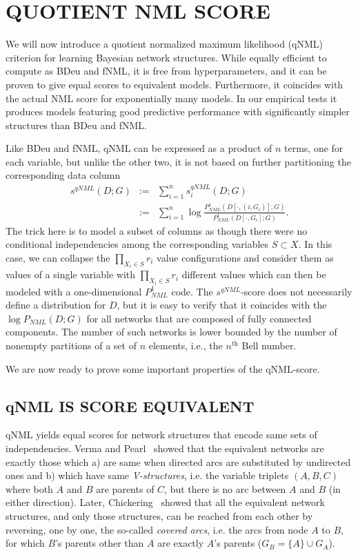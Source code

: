 \section{QUOTIENT NML SCORE}

We will now introduce a quotient normalized maximum likelihood (qNML)
criterion for learning Bayesian network structures.  While equally
efficient to compute as BDeu and fNML, it is free from
hyperparameters, and it can be proven to give equal scores to
equivalent models. Furthermore, it coincides with the actual NML score
for exponentially many models. In our empirical tests it produces
models featuring good predictive performance with significantly
simpler structures than BDeu and fNML.

Like BDeu and fNML, qNML can be expressed as a product of $n$ terms,
one for each variable, but unlike the other two, it is not based on
further partitioning the corresponding data column
\begin{eqnarray}
\label{eqn:qnmldef}
s^{qNML}(D;G) & := & \sum_{i=1}^n s^{qNML}_i(D;G)\\
& := & \sum_{i=1}^n \log \frac{P^1_{NML}(D[\cdot,(i,G_i)];G)}
                             {P^1_{NML}(D[\cdot,G_i];G)}.\nonumber
\end{eqnarray}
The trick here is to model a subset of columns as though there were no
conditional independencies among the corresponding variables $S
\subset X$.  In this case, we can collapse the $\prod_{X_i\in S} r_i$
value configurations and consider them as values of a single variable
with $\prod_{X_i\in S} r_i$ different values which can then be modeled
with a one-dimensional $P^1_{NML}$ code.  The $s^{qNML}$-score does
not necessarily define a distribution for $D$, but it is easy to
verify that it coincides with the $\log P_{NML}(D;G)$ for all networks
that are composed of fully connected components.  The number of such
networks is lower bounded by the number of nonempty partitions of a
set of $n$ elements, i.e., the $n^\text{th}$ Bell number.

We are now ready to prove some important properties of the qNML-score.

\subsection {qNML IS SCORE EQUIVALENT}

qNML yields equal scores for network structures that encode same sets
of independencies. Verma and Pearl~\cite{Verm90} showed that the
equivalent networks are exactly those which a) are same when directed
arcs are substituted by undirected ones and b) which have same
\textit{V-structures}, i.e. the variable triplets $(A,B,C)$ where both
$A$ and $B$ are parents of $C$, but there is no arc between $A$ and
$B$ (in either direction).  Later, Chickering~\cite{Chick95} showed
that all the equivalent network structures, and only those structures,
can be reached from each other by reversing, one by one, the so-called
\textit{covered arcs}, i.e. the arcs from node $A$ to $B$, for which
$B$'s parents other than $A$ are exactly  $A$'s parents
($G_B=\{A\}\cup G_A$).


